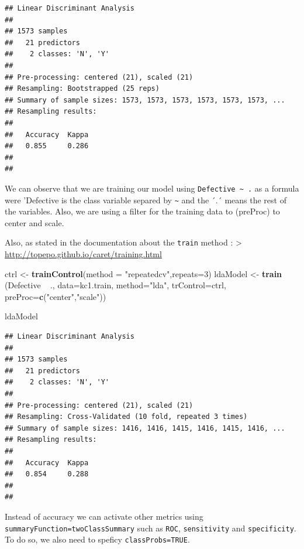 \documentclass[]{book}
\newenvironment{Shaded}{\begin{snugshade}}{\end{snugshade}}
\newcommand{\KeywordTok}[1]{\textcolor[rgb]{0.13,0.29,0.53}{\textbf{{#1}}}}
\newcommand{\DataTypeTok}[1]{\textcolor[rgb]{0.13,0.29,0.53}{{#1}}}
\newcommand{\DecValTok}[1]{\textcolor[rgb]{0.00,0.00,0.81}{{#1}}}
\newcommand{\StringTok}[1]{\textcolor[rgb]{0.31,0.60,0.02}{{#1}}}
\newcommand{\NormalTok}[1]{{#1}}
\begin{document}
\begin{verbatim}
## Linear Discriminant Analysis 
## 
## 1573 samples
##   21 predictors
##    2 classes: 'N', 'Y' 
## 
## Pre-processing: centered (21), scaled (21) 
## Resampling: Bootstrapped (25 reps) 
## Summary of sample sizes: 1573, 1573, 1573, 1573, 1573, 1573, ... 
## Resampling results:
## 
##   Accuracy  Kappa
##   0.855     0.286
## 
## 
\end{verbatim}

We can observe that we are training our model using
\texttt{Defective\ \textasciitilde{}\ .} as a formula were 'Defective is
the class variable separed by \texttt{\textasciitilde{}} and the ´.´
means the rest of the variables. Also, we are using a filter for the
training data to (preProc) to center and scale.

Also, as stated in the documentation about the \texttt{train} method :
\textgreater{} \url{http://topepo.github.io/caret/training.html}

\begin{Shaded}
\begin{Highlighting}[]
\NormalTok{ctrl <-}\StringTok{ }\KeywordTok{trainControl}\NormalTok{(}\DataTypeTok{method =} \StringTok{"repeatedcv"}\NormalTok{,}\DataTypeTok{repeats=}\DecValTok{3}\NormalTok{)}
\NormalTok{ldaModel <-}\StringTok{ }\KeywordTok{train} \NormalTok{(Defective ~}\StringTok{ }\NormalTok{., }\DataTypeTok{data=}\NormalTok{kc1.train, }\DataTypeTok{method=}\StringTok{"lda"}\NormalTok{, }\DataTypeTok{trControl=}\NormalTok{ctrl, }\DataTypeTok{preProc=}\KeywordTok{c}\NormalTok{(}\StringTok{"center"}\NormalTok{,}\StringTok{"scale"}\NormalTok{))}

\NormalTok{ldaModel}
\end{Highlighting}
\end{Shaded}

\begin{verbatim}
## Linear Discriminant Analysis 
## 
## 1573 samples
##   21 predictors
##    2 classes: 'N', 'Y' 
## 
## Pre-processing: centered (21), scaled (21) 
## Resampling: Cross-Validated (10 fold, repeated 3 times) 
## Summary of sample sizes: 1416, 1416, 1415, 1416, 1415, 1416, ... 
## Resampling results:
## 
##   Accuracy  Kappa
##   0.854     0.288
## 
## 
\end{verbatim}

Instead of accuracy we can activate other metrics using
\texttt{summaryFunction=twoClassSummary} such as \texttt{ROC},
\texttt{sensitivity} and \texttt{specificity}. To do so, we also need to
speficy \texttt{classProbs=TRUE}.
\end{document}
